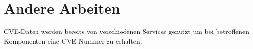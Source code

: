\section{Andere Arbeiten} \label{sec:Andere}
CVE-Daten werden bereits von verschiedenen Services genutzt um bei betroffenen Komponenten eine CVE-Nummer zu erhalten.

